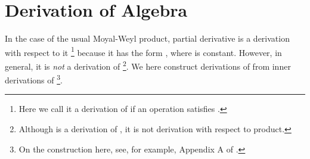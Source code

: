 \documentclass[10pt,a4paper]{article}
\def\h{\hbar}
\begin{document}
\section{Derivation of \myHighlight{$*$}\coordHE{} Algebra
\label{sec:deri}}
In the case of the usual Moyal-Weyl product, partial derivative \coordHE{} is a derivation with respect to it
\footnote{
Here we call it a derivation of \coordHE{} if an operation \coordHE{} satisfies \coordHE{}.
} 
because it has the form \coordHE{}, where \myHighlight{$\vartheta^{\mu\nu}$}\coordHE{} is constant. 
However, in general, it is {\it not} a derivation of \myHighlight{$(C^\infty(M)[[\h]]\otimes {\cal A},*)$}\coordHE{}  
\footnote{
Although \coordHE{} is a derivation of \coordHE{}, it is not derivation with respect to \myHighlight{$*$}\coordHE{} product.
}.
We here construct derivations of \coordHE{} from inner derivations of \coordHE{}
\footnote{
On the construction here, see, for example, Appendix A of \cite{Xu}.
}.\\
\end{document}
